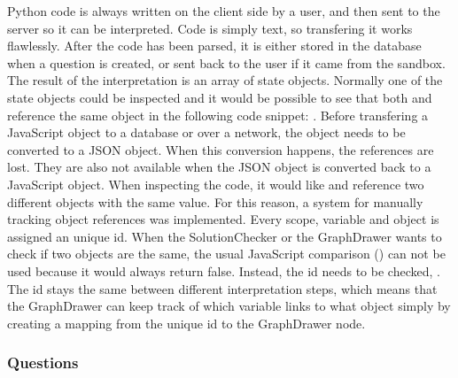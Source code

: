 Python code is always written on the client side by a user, and then sent to the server so it can be interpreted. Code is simply text, so transfering it works flawlessly. After the code has been parsed, it is either stored in the database when a question is created, or sent back to the user if it came from the sandbox. The result of the interpretation is an array of state objects. Normally one of the state objects could be inspected and it would be possible to see that both  and  reference the same object in the following code snippet:
.
Before transfering a JavaScript object to a database or over a network, the object needs to be converted to a JSON object. When this conversion happens, the references are lost. They are also not available when the JSON object is converted back to a JavaScript object. When inspecting the code, it would like  and  reference two different objects with the same value. For this reason, a system for manually tracking object references was implemented. Every scope, variable and object is assigned an unique id. When the SolutionChecker or the GraphDrawer wants to check if two objects are the same, the usual JavaScript comparison () can not be used because it would always return false. Instead, the id needs to be checked, . The id stays the same between different interpretation steps, which means that the GraphDrawer can keep track of which variable links to what object simply by creating a mapping from the unique id to the GraphDrawer node.

\subsubsection{Questions}
